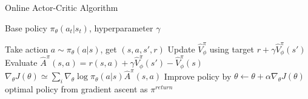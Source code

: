\begin{algorithm}[t!]
\caption{Online Actor-Critic Algorithm}
\begin{algorithmic}[1]
\label{alg:onlineac}
\REQUIRE Base policy $\pi_\theta(a_t|s_t)$, hyperparameter $\gamma$

    \STATE Take action $a\sim\pi_\theta(a|s)$, get $(s,a,s',r)$
    \STATE Update $\hat{V}^\pi_\phi$ using target $r+\gamma\hat{V}^\pi_\phi(s')$
    \STATE Evaluate $\hat{A}^\pi(s,a)=r(s,a)+\gamma\hat{V}^\pi_\phi(s')-\hat{V}^\pi_\phi(s)$
    \STATE $\nabla_\theta J(\theta) \simeq \sum_i\nabla_\theta\log \pi_\theta(a|s)\hat{A}^\pi(s,a)$
    \STATE Improve policy by $\theta \leftarrow \theta + \alpha\nabla_\theta J(\theta)$
\ENDWHILE
\RETURN optimal policy from gradient ascent as $\pi^{return}$
\end{algorithmic}
\end{algorithm}